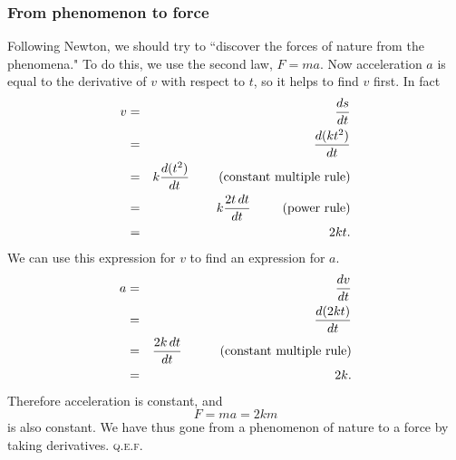 \documentclass[twoside,openright]{article}
\begin{document}
\subsubsection*{From phenomenon to force}
Following Newton, we should try to ``discover the forces of nature
from the phenomena."  To do this, we use the second law, $F = ma$.
Now acceleration $a$ is equal to the derivative of $v$ with respect to
$t$, so it helps to find $v$ first.  In fact
\begin{eqnarray*}
  v & = & \frac{ds}{dt}\\
    & = & \frac{d(kt^2)}{dt}\\
    & = & k\frac{d(t^2)}{dt} \mbox{\hspace{2.3em}(constant multiple rule)}\\
    & = & k\frac{2t\,dt}{dt} \mbox{\hspace{2.5em}(power rule)}\\
    & = & 2kt.
\end{eqnarray*}
We can use this expression for $v$ to find an expression for $a$.
\begin{eqnarray*}
  a & = & \frac{dv}{dt}\\
    & = & \frac{d(2kt)}{dt}\\
    & = & \frac{2k\,dt}{dt}\mbox{\hspace{3em}(constant multiple rule)}\\
    & = & 2k.
\end{eqnarray*}
Therefore acceleration is constant, and 
$$F = ma = 2km$$
is also constant.  We have thus gone from a phenomenon of nature to a
force by taking derivatives. \textsc{q.e.f.}\vspace{2ex}
\end{document}
